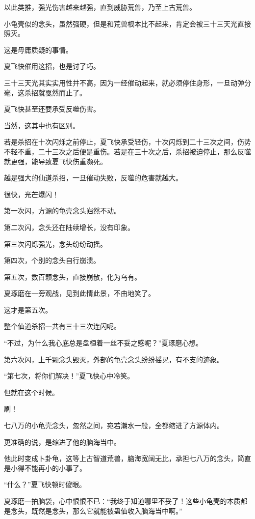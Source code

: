 \begin{this_body}
以此类推，强光伤害越来越强，直到威胁荒兽，乃至上古荒兽。

小龟壳似的念头，虽然强硬，但是和荒兽根本比不起来，肯定会被三十三天光直接照灭。

这是毋庸质疑的事情。

夏飞快催用这招，也是讨了巧。

三十三天光其实实用性并不高，因为一经催动起来，就必须停住身形，一旦动弹分毫，这杀招就戛然而止了。

夏飞快甚至还要承受反噬伤害。

当然，这其中也有区别。

若是杀招在十次闪烁之前停止，夏飞快承受轻伤，十次闪烁到二十三次之间，伤势不轻不重，二十三次之后便是重伤。若是在三十次之后，杀招被迫停止，那么反噬就更强，能导致夏飞快伤重濒死。

越是强大的仙道杀招，一旦催动失败，反噬的危害就越大。

很快，光芒爆闪！

第一次闪，方源的龟壳念头岿然不动。

第二次闪，念头还在陆续增长，没有印象。

第三次闪烁强光，念头纷纷动摇。

第四次，个别的念头自行崩溃。

第五次，数百颗念头，直接崩散，化为乌有。

夏琢磨在一旁观战，见到此情此景，不由地笑了。

这才是第五次。

整个仙道杀招一共有三十三次连闪呢。

“不过，为什么我心底总是盘桓着一丝不妥之感呢？”夏琢磨心想。

第六次闪，上千颗念头毁灭，外部的龟壳念头纷纷摇晃，有不支的迹象。

“第七次，将你们解决！”夏飞快心中冷笑。

但就在这个时候。

刷！

七八万的小龟壳念头，忽然之间，宛若潮水一般，全都缩进了方源体内。

更准确的说，是缩进了他的脑海当中。

他此时变成卜卦龟，这等上古智道荒兽，脑海宽阔无比，承担七八万的念头，简直是小得不能再小的小事了。

“什么？”夏飞快顿时傻眼。

夏琢磨一拍脑袋，心中恨恨不已：“我终于知道哪里不妥了！这些小龟壳的本质都是念头，既然是念头，那么它就能被蛊仙收入脑海当中啊。”


\end{this_body}
